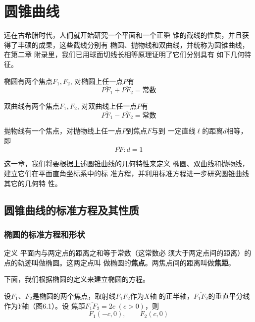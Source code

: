 \chapter{圆锥曲线}
远在古希腊时代，人们就开始研究一个平面和一个正瞬
锥的截线的性质，并且获得了丰硕的成果，这些截线分别有
椭圆、抛物线和双曲线，并统称为圆锥曲线，在第二章
附录里，我们已用球面切线长相等原理证明了它们分别具有
如下几何特征。

椭圆有两个焦点$F_1,F_2$, 对椭圆上任一点$P$有
\[\overline{PF_1}+\overline{PF_2}=\text{常数}\]

双曲线有两个焦点$F_1,F_2$, 对双曲线上任一点$P$有
\[\overline{PF_1}-\overline{PF_2}=\text{常数}\]

抛物线有一个焦点，对抛物线上任一点$P$到焦点$F$与到
一定直线$\ell$的距离$d$相等，即
\[\overline{PF}:d=1\]

这一章，我们将要根据上述圆锥曲线的几何特性来定义
椭圆、双曲线和抛物线，建立它们在平面直角坐标系中的标
准方程，并利用标准方程进一步研究圆锥曲线其它的几何特
性。

\section{圆锥曲线的标准方程及其性质}
\subsection{椭圆的标准方程和形状}
\begin{blk}
    {定义} 平面内与两定点的距离之和等于常数（这常数必
须大于两定点间的距离）的点的轨迹叫做椭圆。这两定点叫
做椭圆的\textbf{焦点}。两焦点间的距离叫做\textbf{焦距}。
\end{blk}

下面，我们根据椭圆的定义来建立椭圆的方程。

设$F_1$、$F_2$是椭圆的两个焦点，取射线$F_1F_2$作为$X$轴
的正半轴，$\overline{F_1F_2}$的垂直平分线作为$Y$轴（图6.1）。设
焦距$\overline{F_1F_2}=2c\; (c>0)$，则
\[F_1(-c,0),\qquad F_2(c,0)\]

\begin{figure}[htp]
    \centering
    \caption{}
\end{figure}


